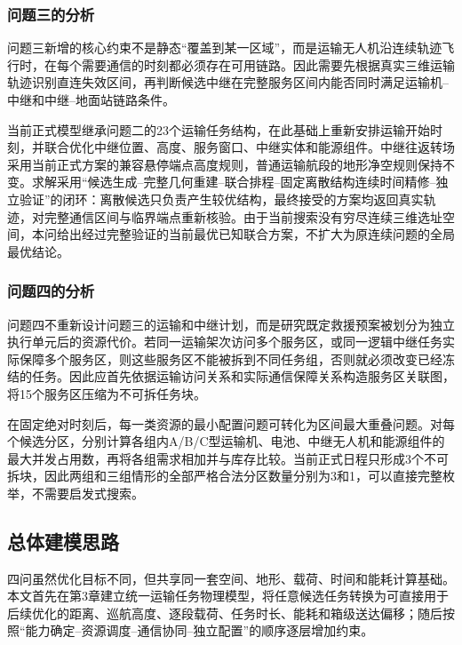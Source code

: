\documentclass[UTF8,a4paper,12pt]{ctexart}
\begin{document}
\subsubsection{问题三的分析}

问题三新增的核心约束不是静态“覆盖到某一区域”，而是运输无人机沿连续轨迹飞行时，在每个需要通信的时刻都必须存在可用链路。因此需要先根据真实三维运输轨迹识别直连失效区间，再判断候选中继在完整服务区间内能否同时满足运输机--中继和中继--地面站链路条件。

当前正式模型继承问题二的23个运输任务结构，在此基础上重新安排运输开始时刻，并联合优化中继位置、高度、服务窗口、中继实体和能源组件。中继往返转场采用当前正式方案的兼容悬停端点高度规则，普通运输航段的地形净空规则保持不变。求解采用“候选生成--完整几何重建--联合排程--固定离散结构连续时间精修--独立验证”的闭环：离散候选只负责产生较优结构，最终接受的方案均返回真实轨迹，对完整通信区间与临界端点重新核验。由于当前搜索没有穷尽连续三维选址空间，本问给出经过完整验证的当前最优已知联合方案，不扩大为原连续问题的全局最优结论。

\subsubsection{问题四的分析}

问题四不重新设计问题三的运输和中继计划，而是研究既定救援预案被划分为独立执行单元后的资源代价。若同一运输架次访问多个服务区，或同一逻辑中继任务实际保障多个服务区，则这些服务区不能被拆到不同任务组，否则就必须改变已经冻结的任务。因此应首先依据运输访问关系和实际通信保障关系构造服务区关联图，将15个服务区压缩为不可拆任务块。

在固定绝对时刻后，每一类资源的最小配置问题可转化为区间最大重叠问题。对每个候选分区，分别计算各组内A/B/C型运输机、电池、中继无人机和能源组件的最大并发占用数，再将各组需求相加并与库存比较。当前正式日程只形成3个不可拆块，因此两组和三组情形的全部严格合法分区数量分别为3和1，可以直接完整枚举，不需要启发式搜索。

\subsection{总体建模思路}

四问虽然优化目标不同，但共享同一套空间、地形、载荷、时间和能耗计算基础。本文首先在第3章建立统一运输任务物理模型，将任意候选任务转换为可直接用于后续优化的距离、巡航高度、逐段载荷、任务时长、能耗和箱级送达偏移；随后按照“能力确定--资源调度--通信协同--独立配置”的顺序逐层增加约束。
\end{document}

